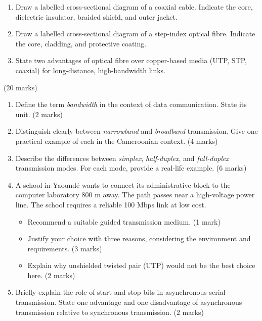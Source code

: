 \documentclass[11pt]{article}
\newcounter{popsec}
\newcounter{popsub}
\newcommand{\courssub}[1]{%
  \stepcounter{popsub}%
  \par\vspace{9pt}\noindent{\popxbold\fontsize{11.5}{13}\selectfont\color{popink}{\color{poporange}\thepopsec.\thepopsub}\hspace{6pt}#1}\par\nopagebreak\vspace{4pt}
}
\begin{document}
\begin{exercice}
\begin{enumerate}
\item Draw a labelled cross-sectional diagram of a coaxial cable. Indicate the core, dielectric insulator, braided shield, and outer jacket.
\item Draw a labelled cross-sectional diagram of a step-index optical fibre. Indicate the core, cladding, and protective coating.
\item State two advantages of optical fibre over copper-based media (UTP, STP, coaxial) for long-distance, high-bandwidth links.
\end{enumerate}
\end{exercice}

\courssub{I prepare for the GCE}

\begin{exercice} (20 marks)
\begin{enumerate}
\item[a)] Define the term \emph{bandwidth} in the context of data communication. State its unit. (2 marks)
\item[b)] Distinguish clearly between \emph{narrowband} and \emph{broadband} transmission. Give one practical example of each in the Cameroonian context. (4 marks)
\item[c)] Describe the differences between \emph{simplex}, \emph{half-duplex}, and \emph{full-duplex} transmission modes. For each mode, provide a real-life example. (6 marks)
\item[d)] A school in Yaoundé wants to connect its administrative block to the computer laboratory 800 m away. The path passes near a high-voltage power line. The school requires a reliable 100 Mbps link at low cost.
\begin{itemize}
\item[i)] Recommend a suitable guided transmission medium. (1 mark)
\item[ii)] Justify your choice with three reasons, considering the environment and requirements. (3 marks)
\item[iii)] Explain why unshielded twisted pair (UTP) would not be the best choice here. (2 marks)
\end{itemize}
\item[e)] Briefly explain the role of start and stop bits in asynchronous serial transmission. State one advantage and one disadvantage of asynchronous transmission relative to synchronous transmission. (2 marks)
\end{enumerate}
\end{exercice}
\end{document}
